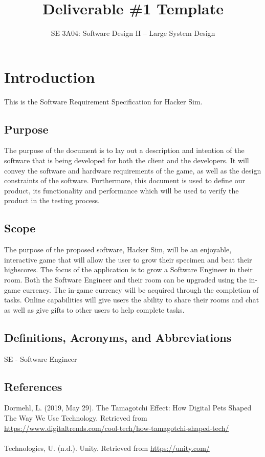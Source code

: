 \documentclass[]{article}
\title{Deliverable \#1 Template}
\author{SE 3A04: Software Design II -- Large System Design}
\date{}
\begin{document}
\maketitle	

\section{Introduction}
\label{sec:introduction}
This is the Software Requirement Specification for Hacker Sim.

\subsection{Purpose}
\label{sub:purpose}
The purpose of the document is to lay out a description and intention of the 
software that is being developed for both the client and the developers. It 
will convey the software and hardware requirements of the game, as well as the 
design constraints of the software. Furthermore, this document is used to define 
our product, its functionality and performance which will be used to verify the 
product in the testing process. 

\subsection{Scope}
\label{sub:scope}
The purpose of the proposed software, Hacker Sim, will be an enjoyable, 
interactive game that will allow the user to grow their specimen and beat their 
highscores. The focus of the application is to grow a Software Engineer in their 
room. Both the Software Engineer and their room can be upgraded using the 
in-game currency. The in-game currency will be acquired through the completion 
of tasks. Online capabilities will give users the ability to share their rooms 
and chat as well as give gifts to other users to help complete tasks. 


\subsection{Definitions, Acronyms, and Abbreviations}
\label{sub:definitions_acronyms_and_abbreviations}
SE - Software Engineer

\subsection{References}
\label{sub:references}
Dormehl, L. (2019, May 29). The Tamagotchi Effect: How Digital Pets Shaped The 
Way We Use Technology. Retrieved from 
\url{https://www.digitaltrends.com/cool-tech/how-tamagotchi-shaped-tech/}
\\\\
Technologies, U. (n.d.). Unity. Retrieved from \url{https://unity.com/}
\end{document}
